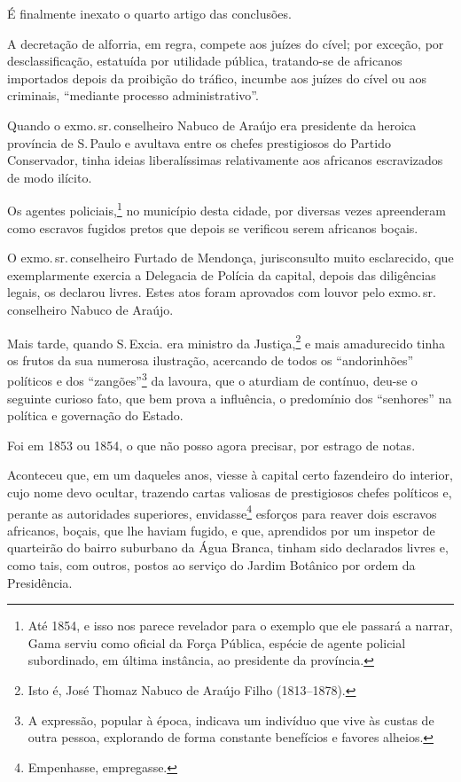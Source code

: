 É finalmente inexato o quarto artigo das conclusões.

A decretação de alforria, em regra, compete aos juízes do cível; por
exceção, por desclassificação, estatuída por utilidade pública,
tratando-se de africanos importados depois da proibição do tráfico,
incumbe aos juízes do cível ou aos criminais, ``mediante processo
administrativo''.

Quando o exmo.\,sr.\,conselheiro Nabuco de Araújo era presidente da
heroica província de S.\,Paulo e avultava entre os chefes prestigiosos do
Partido Conservador, tinha ideias liberalíssimas relativamente aos
africanos escravizados de modo ilícito.

Os agentes policiais,\footnote{Até 1854, e isso nos parece revelador
  para o exemplo que ele passará a narrar, Gama serviu como oficial da
  Força Pública, espécie de agente policial subordinado, em última
  instância, ao presidente da província.} no município desta cidade,
por diversas vezes apreenderam como escravos fugidos pretos que depois
se verificou serem africanos boçais.

O exmo.\,sr.\,conselheiro Furtado de Mendonça, jurisconsulto muito
esclarecido, que exemplarmente exercia a Delegacia de Polícia da
capital, depois das diligências legais, os declarou livres. Estes atos
foram aprovados com louvor pelo exmo.\,sr.\,conselheiro Nabuco de Araújo.

Mais tarde, quando S.\,Excia. era ministro da Justiça,\footnote{Isto é,
  José Thomaz Nabuco de Araújo Filho (1813--1878).} e mais amadurecido
tinha os frutos da sua numerosa ilustração, acercando de todos os
``andorinhões'' políticos e dos ``zangões''\footnote{A expressão, popular
  à época, indicava um indivíduo que vive às custas de outra pessoa,
  explorando de forma constante benefícios e favores alheios.} da
lavoura, que o aturdiam de contínuo, deu-se o seguinte curioso fato, que
bem prova a influência, o predomínio dos ``senhores'' na política e
governação do Estado.

Foi em 1853 ou 1854, o que não posso agora precisar, por estrago de
notas.

Aconteceu que, em um daqueles anos, viesse à capital certo fazendeiro do
interior, cujo nome devo ocultar, trazendo cartas valiosas de
prestigiosos chefes políticos e, perante as autoridades superiores,
envidasse\footnote{Empenhasse, empregasse.} esforços para reaver dois
escravos africanos, boçais, que lhe haviam fugido, e que, aprendidos por
um inspetor de quarteirão do bairro suburbano da Água Branca, tinham
sido declarados livres e, como tais, com outros, postos ao serviço do
Jardim Botânico por ordem da Presidência.

